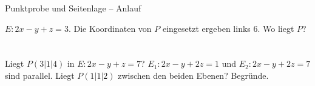 \setcounter{aufgabe}{48}

\begin{aufgabe}{Punktprobe und Seitenlage – Anlauf}
\begin{teile}
\teil $E: 2x - y + z = 3$. Die Koordinaten von $P$ eingesetzt ergeben links $6$. Wo liegt $P$? \\  \\  \\ 
\teil Liegt $P(3 | 1 | 4)$ in $E: 2x - y + z = 7$?
\teil $E_1: 2x - y + 2z = 1$ und $E_2: 2x - y + 2z = 7$ sind parallel. Liegt $P(1 | 1 | 2)$ zwischen den beiden Ebenen? Begründe.
\end{teile}
\end{aufgabe}

